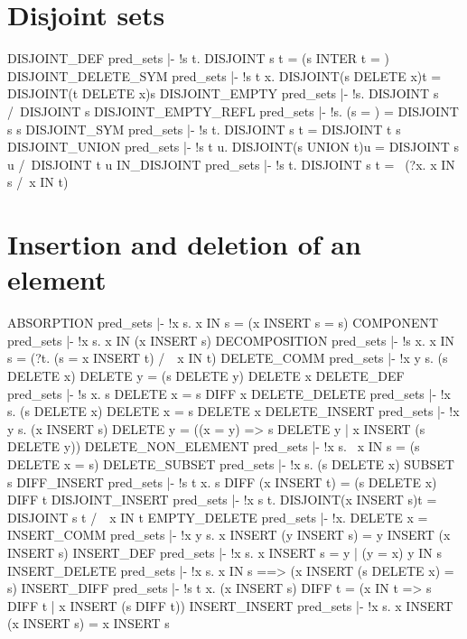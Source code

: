 \section{Disjoint sets}
\THEOREM DISJOINT\_DEF pred\_sets
|- !s t. DISJOINT s t = (s INTER t = {})
\ENDTHEOREM
\THEOREM DISJOINT\_DELETE\_SYM pred\_sets
|- !s t x. DISJOINT(s DELETE x)t = DISJOINT(t DELETE x)s
\ENDTHEOREM
\THEOREM DISJOINT\_EMPTY pred\_sets
|- !s. DISJOINT {} s /\ DISJOINT s {}
\ENDTHEOREM
\THEOREM DISJOINT\_EMPTY\_REFL pred\_sets
|- !s. (s = {}) = DISJOINT s s
\ENDTHEOREM
\THEOREM DISJOINT\_SYM pred\_sets
|- !s t. DISJOINT s t = DISJOINT t s
\ENDTHEOREM
\THEOREM DISJOINT\_UNION pred\_sets
|- !s t u. DISJOINT(s UNION t)u = DISJOINT s u /\ DISJOINT t u
\ENDTHEOREM
\THEOREM IN\_DISJOINT pred\_sets
|- !s t. DISJOINT s t = ~(?x. x IN s /\ x IN t)
\ENDTHEOREM
\section{Insertion and deletion of an element}
\THEOREM ABSORPTION pred\_sets
|- !x s. x IN s = (x INSERT s = s)
\ENDTHEOREM
\THEOREM COMPONENT pred\_sets
|- !x s. x IN (x INSERT s)
\ENDTHEOREM
\THEOREM DECOMPOSITION pred\_sets
|- !s x. x IN s = (?t. (s = x INSERT t) /\ ~x IN t)
\ENDTHEOREM
\THEOREM DELETE\_COMM pred\_sets
|- !x y s. (s DELETE x) DELETE y = (s DELETE y) DELETE x
\ENDTHEOREM
\THEOREM DELETE\_DEF pred\_sets
|- !s x. s DELETE x = s DIFF {x}
\ENDTHEOREM
\THEOREM DELETE\_DELETE pred\_sets
|- !x s. (s DELETE x) DELETE x = s DELETE x
\ENDTHEOREM
\THEOREM DELETE\_INSERT pred\_sets
|- !x y s.
    (x INSERT s) DELETE y =
    ((x = y) => s DELETE y | x INSERT (s DELETE y))
\ENDTHEOREM
\THEOREM DELETE\_NON\_ELEMENT pred\_sets
|- !x s. ~x IN s = (s DELETE x = s)
\ENDTHEOREM
\THEOREM DELETE\_SUBSET pred\_sets
|- !x s. (s DELETE x) SUBSET s
\ENDTHEOREM
\THEOREM DIFF\_INSERT pred\_sets
|- !s t x. s DIFF (x INSERT t) = (s DELETE x) DIFF t
\ENDTHEOREM
\THEOREM DISJOINT\_INSERT pred\_sets
|- !x s t. DISJOINT(x INSERT s)t = DISJOINT s t /\ ~x IN t
\ENDTHEOREM
\THEOREM EMPTY\_DELETE pred\_sets
|- !x. {} DELETE x = {}
\ENDTHEOREM
\THEOREM INSERT\_COMM pred\_sets
|- !x y s. x INSERT (y INSERT s) = y INSERT (x INSERT s)
\ENDTHEOREM
\THEOREM INSERT\_DEF pred\_sets
|- !x s. x INSERT s = {y | (y = x) \/ y IN s}
\ENDTHEOREM
\THEOREM INSERT\_DELETE pred\_sets
|- !x s. x IN s ==> (x INSERT (s DELETE x) = s)
\ENDTHEOREM
\THEOREM INSERT\_DIFF pred\_sets
|- !s t x.
    (x INSERT s) DIFF t = (x IN t => s DIFF t | x INSERT (s DIFF t))
\ENDTHEOREM
\THEOREM INSERT\_INSERT pred\_sets
|- !x s. x INSERT (x INSERT s) = x INSERT s
